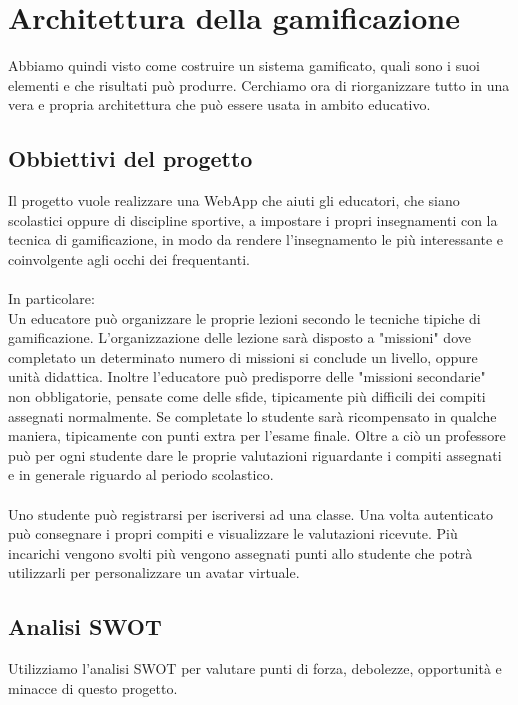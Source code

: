 \chapter{Architettura della gamificazione}
Abbiamo quindi visto come costruire un sistema gamificato, quali sono i suoi elementi e che risultati può produrre. Cerchiamo ora di riorganizzare tutto in una vera e propria architettura che può essere usata in ambito educativo.

\section{Obbiettivi del progetto}

Il progetto vuole realizzare una WebApp che aiuti gli educatori, che siano scolastici oppure di discipline sportive, a impostare i propri insegnamenti con la tecnica di gamificazione, in modo da rendere l'insegnamento le più interessante e coinvolgente agli occhi dei frequentanti.\\
\\
In particolare:\\
 Un educatore può organizzare le proprie lezioni secondo le tecniche tipiche di gamificazione. L'organizzazione delle lezione sarà disposto a "missioni" dove completato un determinato numero di missioni si conclude un livello, oppure unità didattica.
Inoltre l'educatore può predisporre delle "missioni secondarie" non obbligatorie, pensate come delle sfide, tipicamente più difficili dei compiti assegnati normalmente. Se completate lo studente sarà ricompensato in qualche maniera, tipicamente con punti extra per l'esame finale.
Oltre a ciò un professore può per ogni studente dare le proprie valutazioni riguardante i compiti assegnati e in generale riguardo al periodo scolastico.\\
\\
Uno studente può registrarsi per iscriversi ad una classe. Una volta autenticato può consegnare i propri compiti e visualizzare le valutazioni ricevute. Più incarichi vengono svolti più vengono assegnati punti allo studente che potrà utilizzarli per personalizzare un avatar virtuale.\\
\section{Analisi SWOT}

Utilizziamo l'analisi SWOT per valutare punti di forza, debolezze, opportunità e minacce di questo progetto.

